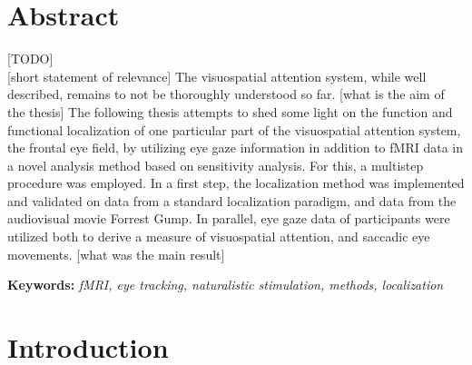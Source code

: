 \documentclass[a4paper, 12pt]{scrreprt}
\begin{document}
\clearpage

\setcounter{page}{1}	%


\chapter*{Abstract}

[TODO] \\

[short statement of relevance]
The visuospatial attention system, while well described, remains to not be thoroughly understood so far. 
[what is the aim of the thesis]
The following thesis attempts to shed some light on the function and functional localization of one particular part of the visuospatial attention system, the frontal eye field, by utilizing eye gaze information in addition to fMRI data in a novel analysis method based on sensitivity analysis. 
For this, a multistep procedure was employed. 
In a first step, the localization method was implemented and validated on data from a standard localization paradigm, and data from the audiovisual movie Forrest Gump.
In parallel, eye gaze data of participants were utilized both to derive a measure of visuospatial attention, and saccadic eye movements.
[what was the main result]

\bigskip

\textbf{Keywords:} \textit{fMRI, eye tracking, naturalistic stimulation, methods, localization}



\chapter{Introduction}\label{section:intro}
\end{document}
